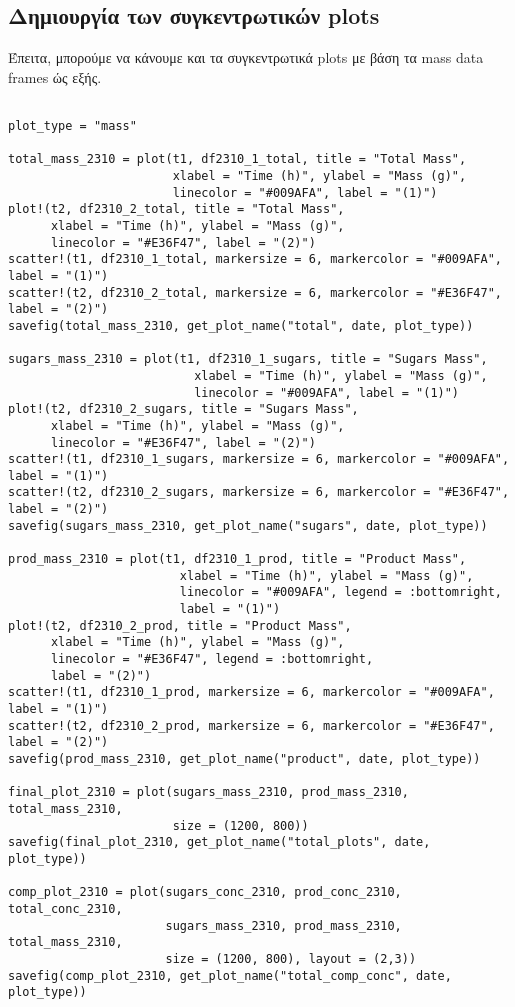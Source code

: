 \documentclass[11pt]{article}
\begin{document}
\subsection{Δημιουργία των συγκεντρωτικών plots}
\label{sec:org59843f1}
Έπειτα, μπορούμε να κάνουμε και τα συγκεντρωτικά plots με βάση τα mass data frames ώς εξής.

\begin{verbatim}

plot_type = "mass"

total_mass_2310 = plot(t1, df2310_1_total, title = "Total Mass",
                       xlabel = "Time (h)", ylabel = "Mass (g)",
                       linecolor = "#009AFA", label = "(1)")
plot!(t2, df2310_2_total, title = "Total Mass",
      xlabel = "Time (h)", ylabel = "Mass (g)",
      linecolor = "#E36F47", label = "(2)")
scatter!(t1, df2310_1_total, markersize = 6, markercolor = "#009AFA", label = "(1)")
scatter!(t2, df2310_2_total, markersize = 6, markercolor = "#E36F47", label = "(2)")
savefig(total_mass_2310, get_plot_name("total", date, plot_type))

sugars_mass_2310 = plot(t1, df2310_1_sugars, title = "Sugars Mass",
                          xlabel = "Time (h)", ylabel = "Mass (g)",
                          linecolor = "#009AFA", label = "(1)")
plot!(t2, df2310_2_sugars, title = "Sugars Mass",
      xlabel = "Time (h)", ylabel = "Mass (g)",
      linecolor = "#E36F47", label = "(2)")
scatter!(t1, df2310_1_sugars, markersize = 6, markercolor = "#009AFA", label = "(1)")
scatter!(t2, df2310_2_sugars, markersize = 6, markercolor = "#E36F47", label = "(2)")
savefig(sugars_mass_2310, get_plot_name("sugars", date, plot_type))

prod_mass_2310 = plot(t1, df2310_1_prod, title = "Product Mass",
                        xlabel = "Time (h)", ylabel = "Mass (g)",
                        linecolor = "#009AFA", legend = :bottomright,
                        label = "(1)")
plot!(t2, df2310_2_prod, title = "Product Mass",
      xlabel = "Time (h)", ylabel = "Mass (g)",
      linecolor = "#E36F47", legend = :bottomright,
      label = "(2)")
scatter!(t1, df2310_1_prod, markersize = 6, markercolor = "#009AFA", label = "(1)")
scatter!(t2, df2310_2_prod, markersize = 6, markercolor = "#E36F47", label = "(2)")
savefig(prod_mass_2310, get_plot_name("product", date, plot_type))

final_plot_2310 = plot(sugars_mass_2310, prod_mass_2310, total_mass_2310,
                       size = (1200, 800))
savefig(final_plot_2310, get_plot_name("total_plots", date, plot_type))

comp_plot_2310 = plot(sugars_conc_2310, prod_conc_2310, total_conc_2310,
                      sugars_mass_2310, prod_mass_2310, total_mass_2310,
                      size = (1200, 800), layout = (2,3))
savefig(comp_plot_2310, get_plot_name("total_comp_conc", date, plot_type))

\end{verbatim}
\end{document}
